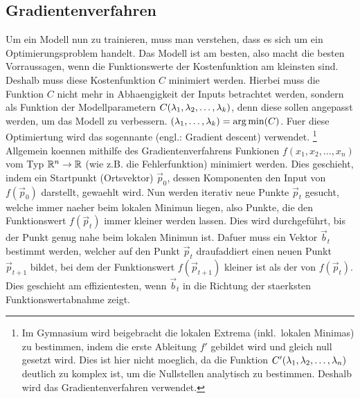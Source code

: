 \subsection{Gradientenverfahren}\label{sec:gradientenverfahren}
Um ein Modell nun zu trainieren, muss man verstehen, dass es sich um ein Optimierungsproblem handelt.
Das Modell ist am besten, also macht die besten Vorraussagen, wenn die
Funktionswerte der Kostenfunktion am kleinsten sind.
Deshalb muss diese Kostenfunktion $C$ minimiert werden.
Hierbei muss die Funktion $C$ nicht mehr in Abhaengigkeit der Inputs betrachtet
werden, sondern als Funktion der Modellparametern
$C(\lambda_1, \lambda_2, \ldots, \lambda_k)$, denn diese sollen angepasst werden,
um das Modell zu verbessern. $\displaystyle (\lambda_1,\ldots,\lambda_k) = \operatorname*{\arg
  \min}(C)$.
Fuer diese Optimiertung wird das sogennante  (engl.: Gradient descent) verwendet.
\footnote{
  Im Gymnasium wird beigebracht die lokalen Extrema (inkl.\ lokalen Minimas) zu bestimmen, indem die erste Ableitung $f'$ gebildet wird und  gleich null gesetzt wird.
  Dies ist hier nicht moeglich, da die Funktion $C'(\lambda_1,\lambda_2, \ldots,
  \lambda_n)$ deutlich zu komplex ist, um die Nullstellen analytisch zu bestimmen. Deshalb wird das Gradientenverfahren verwendet.
}
\para{}
Allgemein koennen mithilfe des Gradientenverfahrens Funkionen $f(x_1, x_2, \ldots, x_n)$ vom Typ $\mathbb{R}^n \to \mathbb{R}$ (wie z.B. die Fehlerfunktion) minimiert werden.
Dies geschieht, indem ein Startpunkt (Ortsvektor) $\vec{p}_0$, dessen
Komponenten den Input von $f(\vec{p}_0)$ darstellt, gewaehlt wird.
Nun werden iterativ neue Punkte $\vec{p}_t$ gesucht, welche immer naeher beim lokalen Minimun liegen, also Punkte, die den Funktionswert $f(\vec{p}_t)$ immer kleiner werden lassen.
Dies wird durchgeführt, bis der Punkt genug nahe beim lokalen Minimun ist.
\para{}
Dafuer muss ein Vektor $\vec{b}_t$ bestimmt werden, welcher auf den Punkt $\vec{p}_t$ draufaddiert einen neuen Punkt $\vec{p}_{t+1}$ bildet,
bei dem der Funktionswert $f(\vec{p}_{t+1})$ kleiner ist als der von $f(\vec{p}_t)$.
Dies geschieht am effizientesten, wenn $\vec{b}_t$ in die Richtung der staerksten Funktionswertabnahme zeigt.

